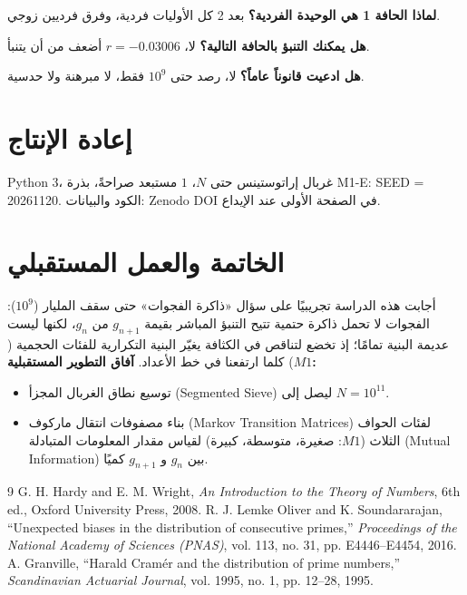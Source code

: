 \documentclass[12pt,a4paper]{article}
\begin{document}
\textbf{لماذا الحافة 1 هي الوحيدة الفردية؟} بعد 2 كل الأوليات فردية، وفرق فرديين زوجي.

\textbf{هل يمكنك التنبؤ بالحافة التالية؟} لا، $r=-0.03006$ أضعف من أن يتنبأ.

\textbf{هل ادعيت قانوناً عاماً؟} لا، رصد حتى $10^9$ فقط، لا مبرهنة ولا حدسية.

\section{إعادة الإنتاج}
\textenglish{Python 3}، غربال إراتوستينس حتى $N$، $1$ مستبعد صراحةً، بذرة M1-E: \textenglish{SEED = 20261120}. الكود والبيانات: \textenglish{Zenodo DOI} في الصفحة الأولى عند الإيداع.

\section{الخاتمة والعمل المستقبلي}
أجابت هذه الدراسة تجريبيًا على سؤال «ذاكرة الفجوات» حتى سقف المليار ($10^9$): الفجوات لا تحمل ذاكرة حتمية تتيح التنبؤ المباشر بقيمة $g_{n+1}$ من $g_n$، لكنها ليست عديمة البنية تمامًا؛ إذ تخضع لتناقص في الكثافة يغيّر البنية التكرارية للفئات الحجمية ($M1$) كلما ارتفعنا في خط الأعداد.
\textbf{آفاق التطوير المستقبلية:}
\begin{itemize}
\item توسيع نطاق الغربال المجزأ (\textenglish{Segmented Sieve}) ليصل إلى $N = 10^{11}$.
\item بناء مصفوفات انتقال ماركوف (\textenglish{Markov Transition Matrices}) لفئات الحواف الثلاث ($M1$: صغيرة، متوسطة، كبيرة) لقياس مقدار المعلومات المتبادلة (\textenglish{Mutual Information}) بين $g_n$ و $g_{n+1}$ كميًا.
\end{itemize}

\begin{thebibliography}{9}
G. H. Hardy and E. M. Wright, \textit{An Introduction to the Theory of Numbers}, 6th ed., Oxford University Press, 2008.
R. J. Lemke Oliver and K. Soundararajan, ``Unexpected biases in the distribution of consecutive primes,'' \textit{Proceedings of the National Academy of Sciences (PNAS)}, vol. 113, no. 31, pp. E4446--E4454, 2016.
A. Granville, ``Harald Cramér and the distribution of prime numbers,'' \textit{Scandinavian Actuarial Journal}, vol. 1995, no. 1, pp. 12--28, 1995.
\end{thebibliography}
\end{document}
